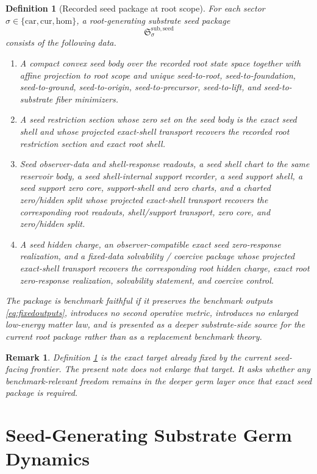 \documentclass[11pt]{article}
\newcommand{\Car}{\mathrm{car}}
\newcommand{\Cur}{\mathrm{cur}}
\newcommand{\Hom}{\mathrm{hom}}
\newcommand{\SeedPackage}{\mathfrak S^{\mathrm{sub,seed}}}
\newtheorem{definition}{Definition}
\newtheorem{remark}{Remark}
\begin{document}
\begin{definition}[Recorded seed package at root scope]
\label{def:seed}
For each sector \(\sigma\in\{\Car,\Cur,\Hom\}\), a \emph{root-generating substrate seed package}
\[
\SeedPackage_{\sigma}
\]
consists of the following data.
\begin{enumerate}
    \item A compact convex seed body over the recorded root state space together with affine projection to root scope and unique seed-to-root, seed-to-foundation, seed-to-ground, seed-to-origin, seed-to-precursor, seed-to-lift, and seed-to-substrate fiber minimizers.
    \item A seed restriction section whose zero set on the seed body is the exact seed shell and whose projected exact-shell transport recovers the recorded root restriction section and exact root shell.
    \item Seed observer-data and shell-response readouts, a seed shell chart to the same reservoir body, a seed shell-internal support recorder, a seed support shell, a seed support zero core, support-shell and zero charts, and a charted zero/hidden split whose projected exact-shell transport recovers the corresponding root readouts, shell/support transport, zero core, and zero/hidden split.
    \item A seed hidden charge, an observer-compatible exact seed zero-response realization, and a fixed-data solvability / coercive package whose projected exact-shell transport recovers the corresponding root hidden charge, exact root zero-response realization, solvability statement, and coercive control.
\end{enumerate}
The package is \emph{benchmark faithful} if it preserves the benchmark outputs \eqref{eq:fixedoutputs}, introduces no second operative metric, introduces no enlarged low-energy matter law, and is presented as a deeper substrate-side source for the current root package rather than as a replacement benchmark theory.
\end{definition}

\begin{remark}
Definition \ref{def:seed} is the exact target already fixed by the current seed-facing frontier. The present note does not enlarge that target. It asks whether any benchmark-relevant freedom remains in the deeper germ layer once that exact seed package is required.
\end{remark}

\section{Seed-Generating Substrate Germ Dynamics}
\end{document}
